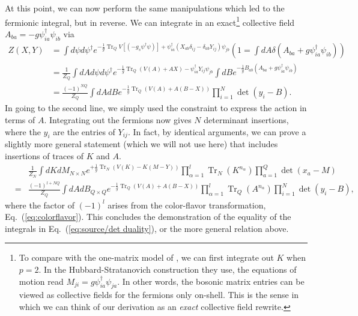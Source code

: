\documentclass[english]{article}
\DeclareMathOperator{\Tr}{Tr}
\begin{document}
At this point, we can now perform the same manipulations which led to the fermionic integral, but in reverse. We can integrate in an exact\footnote{To compare with the one-matrix model of \cite{exact}, we can first integrate out $K$ when $p=2$. In the Hubbard-Stratanovich construction they use, the equations of motion read $M_{ji}= g \psi^{\dagger}_{ia}\psi_{ja}$. In other words, the bosonic matrix entries can be viewed as collective fields for the fermions only on-shell.  This is the sense in which we can think of our derivation as an \textit{exact} collective field rewrite.} collective field $A_{ba}=-g \psi^{\dagger}_{ia}\psi_{ib}$ via 
\begin{align}
      Z(X,Y) & =  \int d\psi d\psi^{\dagger} e^{-\frac{1}{g} \Tr_{Q} V\left[(-g_s \psi^{\dagger}\psi ) \right]+\psi^{\dagger}_{ia}\left( X_{ab} \delta_{ij} - \delta_{ab} Y_{ij}\right) \psi_{jb}} \left( 1 = \int dA \delta(A_{ba}+g \psi^{\dagger}_{ia}\psi_{ib}) \right)\\
    & =  \frac{1}{Z_{Q}}\int dA d\psi d\psi^{\dagger} e^{-\frac{1}{g} \Tr_{Q} \left( V(A) + AX \right)-\psi^{\dagger}_{ia}Y_{ij}\psi_{jb}} \int dB e^{- \frac{1}{g}B_{ab} \left( A_{ba}+ g \psi^{\dagger}_{ia}\psi_{ib}\right) } \\
     & = \frac{(-1)^{NQ}}{Z_{Q}} \int dA dB e^{-\frac{1}{g} \Tr_{Q} \left( V(A)+A(B-X) \right)} \prod_{i=1}^{N} \det \left(y_i-B \right).
\end{align}
In going to the second line, we simply used the constraint to express the action in terms of $A$. Integrating out the fermions now gives $N$ determinant insertions, where the $y_i$ are the entries of $Y_{ij}$. In fact, by identical arguments, we can prove a slightly more general statement (which we will not use here) that includes insertions of traces of $K$ and $A$.
\begin{eqnarray}
   & &\frac{1}{Z_{N}} \int dK dM_{N \times N} e^{+ \frac{1}{g} \Tr_N \left( V(K) - K(M-Y) \right)} \prod_{\alpha=1}^{l} \Tr_{N}(K^{n_\alpha}) \prod_{a=1}^{Q} \det(x_{a}-M)  \nonumber \\
   &=& \frac{(-1)^{l+NQ}}{Z_{Q}}\int dA dB_{Q \times Q} e^{- \frac{1}{g} \Tr_Q \left( V(A) + A(B-X) \right)}  \prod_{\alpha=1}^{l}\Tr_{Q}(A^{n_\alpha}) \prod_{i=1}^{N} \det(y_{i}-B) , 
\end{eqnarray}
where the factor of $(-1)^l$ arises from the color-flavor transformation, Eq.~(\ref{eq:colorflavor}). 
This concludes the demonstration of the equality of the integrals in Eq.~(\ref{eq:source/det duality}), or the more general relation above. 
\end{document}
